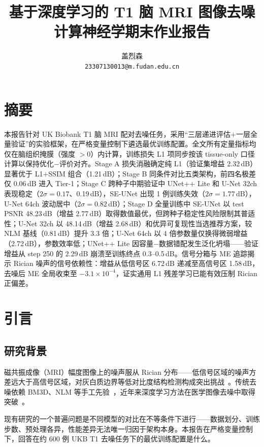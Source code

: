 \documentclass[UTF8,a4paper,12pt]{ctexart}
\title{\textbf{基于深度学习的 T1 脑 MRI 图像去噪}\\[0.5em]\large 计算神经学期末作业报告}
\author{盖烈森 \\ \texttt{23307130013@m.fudan.edu.cn}}
\date{}
\begin{document}
\maketitle
\pagestyle{plain}
\thispagestyle{plain}

\section*{摘要}
本报告针对 UK Biobank T1 脑 MRI 配对去噪任务，采用``三层递进评估$+$一层全量验证''的实验框架，在严格变量控制下遴选最优训练配置。全文所有定量指标均仅在脑组织掩膜（强度 $>0$）内计算，训练损失 L1 项同步按该 tissue-only 口径计算以保持优化$-$评价对齐。Stage A 损失消融确定纯 L1（验证集增益 2.32\,dB）显著优于 L1$+$SSIM 组合（1.21\,dB）；Stage B 同条件对比五类架构，前四名极差仅 0.06\,dB 进入 Tier-1；Stage C 跨种子中期验证中 UNet++ Lite 和 U-Net 32ch 表现稳定（$2\sigma=0.17$、0.19\,dB），SE-UNet 出现 1 例训练失效（$2\sigma=1.77$\,dB），U-Net 64ch 波动居中（$2\sigma=0.82$\,dB）；Stage D 全量训练中 SE-UNet 以 test PSNR 48.23\,dB（增益 2.77\,dB）取得数值最优，但跨种子稳定性风险限制其普适性；U-Net 32ch 以 48.14\,dB（增益 2.68\,dB）和优异可复现性当选推荐方案，较 NLM 基线（0.81\,dB）提升 3.3 倍；U-Net 64ch 以 4 倍参数量仅换得微弱增益（2.72\,dB），参数效率低；UNet++ Lite 因容量$-$数据错配发生泛化坍塌——验证增益从 step 250 的 2.29\,dB 崩溃至训练终点 0.3--0.5\,dB。信号分箱与 ME 追踪揭示 Rician 噪声的信号依赖性：增益从低信号区 6.72\,dB 递减至高信号区 1.58\,dB，去噪后 ME 全局收束至 $-3.1\times 10^{-4}$，证实通用 L1 残差学习已能有效压制 Rician 正偏差。

\section{引言}

\subsection{研究背景}
磁共振成像（MRI）幅度图像上的噪声服从 Rician 分布——低信号区域的噪声方差远大于高信号区域，对灰白质边界等低对比度结构检测构成突出挑战~\cite{Gudbjartsson1995Rician}。传统去噪依赖 BM3D、NLM 等手工先验~\cite{Dabov2007BM3D}，近年来深度学习方法在医学图像去噪中取得突破~\cite{Zhang2017DnCNN,Chen2017REDCNN,Ronneberger2015UNet,Hu2018SENet}。

现有研究的一个普遍问题是不同模型的对比在不等条件下进行——数据划分、训练步数、预处理各异，性能差异无法唯一归因于架构本身。本报告在严格变量控制下，回答在约 600 例 UKB T1 去噪任务下的最优训练配置是什么。
\end{document}
